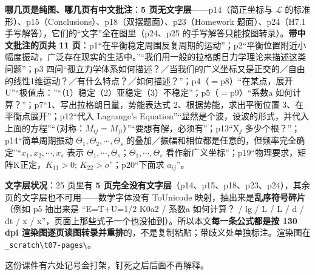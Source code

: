 \documentclass[11pt]{ctexart}
\begin{document}
\textbf{哪几页是纯图、哪几页有中文批注}：\textbf{5 页无文字层}——p14（简正坐标与 $\mathcal{L}$ 的标准形）、p15（Conclusions）、p18（双摆题面）、p23（Homework 题面）、p24（H7.1 手写解答），它们的“文字”全在图里（p24、p25 的手写解答只能按图转录）。\textbf{带中文批注的页共 11 页}：p1“在平衡稳定周围反复周期的运动”；p2“平衡位置附近小幅度振动，广泛存在现实的生活中。”“我们用一般的拉格朗日力学理论来描述这类问题”；p3 四问“孤立力学体系如何描述？／当我们的广义坐标又是正交的／自由的线性1维运动？／有什么特点？／如何描述？”；p4（$=$p8）“在某点，展开U”“极值点：”“（1）稳定（2）亚稳定（3）不稳定”；p5（$=$p9）“系数a 如何计算？”；p7“1、写出拉格朗日量，势能表达式 2、根据势能，求出平衡位置 3、在平衡点展开”；p12“代入 Lagrange's Equation”“显然是个波，设波的形式，并代入上面的方程”“（对称：$M_{ij}=M_{ji}$）”“要想有解，必须有”；p13“X$_j$ 多少个根？”；p14“简单周期振动 $\Theta_1,\Theta_2,\cdots,\Theta_s$ 的叠加／振幅和相位都是任意的，但频率完全确定”“$x_1,x_2,\cdots,x_s$ 表示 $\Theta_1,\cdots,\Theta_s$；$\Theta_1,\cdots,\Theta_s$ 看作新广义坐标”；p19“物理要求，矩阵K正定，$K_{11}>0$; $K_{22}>o$”；p20“下面求 $a_{ij}$”。

\textbf{文字层状况}：25 页里有 \textbf{5 页完全没有文字层}（p14、p15、p18、p23、p24），其余页的文字层也不可用——数学字体没有 ToUnicode 映射，抽出来是\textbf{乱序符号碎片}（例如 p5 抽出来是 “E=T+U=1/2 K0a2 / 系数a 如何计算？ / lg / L / L / d / dt / x / x”，页面上那些式子一个也没抽到）。所以本文\textbf{每一条公式都是按 130 dpi 渲染图逐页读图转录并重排}的，不是复制粘贴；带歧义处单独标注。渲染图在 \texttt{\_scratch\textbackslash t07-pages\textbackslash}。


这份课件有六处记号会打架，钉死之后后面不再解释。
\end{document}
